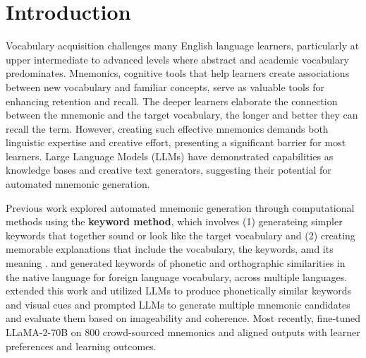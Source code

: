 
\section{Introduction} \label{sec:intro}
Vocabulary acquisition challenges many English language learners, particularly at upper intermediate to advanced levels where abstract and academic vocabulary predominates. Mnemonics, cognitive tools that help learners create associations between new vocabulary and familiar concepts, serve as valuable tools for enhancing retention and recall. The deeper learners elaborate the connection between the mnemonic and the target vocabulary, the longer and better they can recall the term. However, creating such effective mnemonics demands both linguistic expertise and creative effort, presenting a significant barrier for most learners. Large Language Models (LLMs) have demonstrated capabilities as knowledge bases and creative text generators, suggesting their potential for automated mnemonic generation.

Previous work explored automated mnemonic generation through computational methods using the \textbf{keyword method}, which involves (1) generateing simpler keywords that together sound or look like the target vocabulary and (2) creating memorable explanations that include the vocabulary, the keywords, amd its meaning \citep{atkinsonApplicationMnemonicKeyword1975}. \citet{savvaTransPhonerAutomatedMnemonic2014} and \citet{OzbalAUTOMATION2014} generated keywords of phonetic and orthographic similarities in the native language for foreign language vocabulary, across multiple languages. \citet{LeeSMARTPHONE2023} extended this work and utilized LLMs to produce phonetically similar keywords and visual cues and \citet{LeeEXPLORING2024} prompted LLMs to generate multiple mnemonic candidates and evaluate them based on imageability and coherence. Most recently, \citet{BalepurSMART2024} fine-tuned LLaMA-2-70B on 800 crowd-sourced mnemonics and aligned outputs with learner preferences and learning outcomes.


